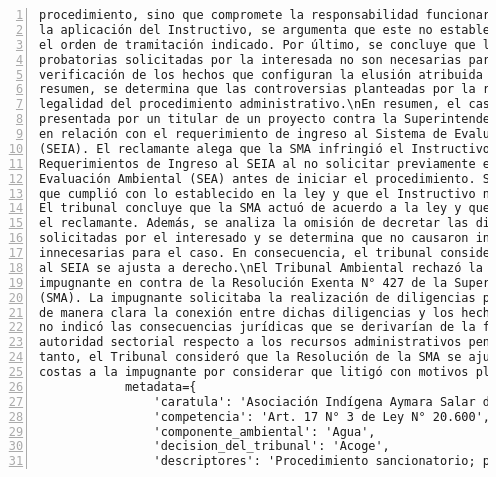 \begin{Verbatim}[frame=lines, label=Elavoración propia -  Ejemplo de Contexto enviado por el Chatbot a OpenAI
				, fontsize=\scriptsize, numbers=left
				, baselinestretch=0.4
				, formatcom=\color{gray}]
procedimiento, sino que compromete la responsabilidad funcionaria. En relación a la omisión en
la aplicación del Instructivo, se argumenta que este no establece la obligatoriedad de seguir
el orden de tramitación indicado. Por último, se concluye que las solicitudes de diligencias
probatorias solicitadas por la interesada no son necesarias para confirmar o rechazar la
verificación de los hechos que configuran la elusión atribuida en la resolución impugnada. En
resumen, se determina que las controversias planteadas por la reclamante no afectan la
legalidad del procedimiento administrativo.\nEn resumen, el caso trata sobre una reclamación
presentada por un titular de un proyecto contra la Superintendencia del Medio Ambiente (SMA)
en relación con el requerimiento de ingreso al Sistema de Evaluación de Impacto Ambiental
(SEIA). El reclamante alega que la SMA infringió el Instructivo para la Tramitación de
Requerimientos de Ingreso al SEIA al no solicitar previamente el informe del Servicio de
Evaluación Ambiental (SEA) antes de iniciar el procedimiento. Sin embargo, la SMA argumenta
que cumplió con lo establecido en la ley y que el Instructivo no es de carácter obligatorio.
El tribunal concluye que la SMA actuó de acuerdo a la ley y que no se produjo indefensión para
el reclamante. Además, se analiza la omisión de decretar las diligencias probatorias
solicitadas por el interesado y se determina que no causaron indefensión y que eran
innecesarias para el caso. En consecuencia, el tribunal considera que la resolución de ingreso
al SEIA se ajusta a derecho.\nEl Tribunal Ambiental rechazó la reclamación presentada por la
impugnante en contra de la Resolución Exenta N° 427 de la Superintendencia del Medio Ambiente
(SMA). La impugnante solicitaba la realización de diligencias probatorias, pero no especificó
de manera clara la conexión entre dichas diligencias y los hechos que deseaba probar. Además,
no indicó las consecuencias jurídicas que se derivarían de la falta de pronunciamiento de la
autoridad sectorial respecto a los recursos administrativos pendientes de resolución. Por lo
tanto, el Tribunal consideró que la Resolución de la SMA se ajusta a derecho. No se condenó en
costas a la impugnante por considerar que litigó con motivos plausibles.',
            metadata={
                'caratula': 'Asociación Indígena Aymara Salar de Coposa con SMA ',
                'competencia': 'Art. 17 N° 3 de Ley N° 20.600',
                'componente_ambiental': 'Agua',
                'decision_del_tribunal': 'Acoge',
                'descriptores': 'Procedimiento sancionatorio; programa de cumplimiento;

\end{Verbatim}

